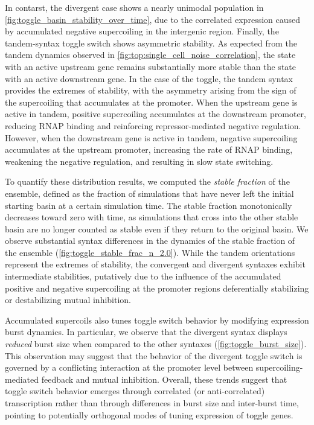 \documentclass[11pt]{article}
\begin{document}
In contarst, the divergent case shows a nearly unimodal population in \cref{fig:toggle_basin_stability_over_time}, due to the correlated expression caused by accumulated negative supercoiling in the intergenic region.
Finally, the tandem-syntax toggle switch shows asymmetric stability. As expected from the tandem dynamics observed in \cref{fig:top:single_cell_noise_correlation}, the state with an active upstream gene remains substantially more stable than the state with an active downstream gene. In the case of the toggle, the tandem syntax provides the extremes of stability, with the asymmetry arising from the sign of the supercoiling that accumulates at the promoter. When the upstream gene is active in tandem, positive supercoiling accumulates at the downstream promoter, reducing RNAP binding and reinforcing repressor-mediated negative regulation. However, when the downstream gene is active in tandem, negative supercoiling accumulates at the upstream promoter, increasing the rate of RNAP binding, weakening the negative regulation, and resulting in slow state switching.

To quantify these distribution results, we computed the \emph{stable fraction} of the ensemble, defined as the fraction of simulations that have never left the initial starting basin at a certain simulation time.
The stable fraction monotonically decreases toward zero with time, as simulations that cross into the other stable basin are no longer counted as stable even if they return to the original basin.
We observe substantial syntax differences in the dynamics of the stable fraction of the ensemble (\cref{fig:toggle_stable_frac_n_2.0}). While the tandem orientations represent the extremes of stability, the convergent and divergent syntaxes exhibit intermediate stabilities, putatively due to the influence of the accumulated positive and negative supercoiling at the promoter regions deferentially stabilizing or destabilizing mutual inhibition.

Accumulated supercoils also tunes toggle switch behavior by modifying expression burst dynamics. In particular, we observe that the divergent syntax displays \emph{reduced} burst size when compared to the other syntaxes (\cref{fig:toggle_burst_size}). This observation may suggest that the behavior of the divergent toggle switch is governed by a conflicting interaction at the promoter level between supercoiling-mediated feedback and mutual inhibition.
Overall, these trends suggest that toggle switch behavior emerges through correlated (or anti-correlated) transcription rather than through differences in burst size and inter-burst time, pointing to potentially orthogonal modes of tuning expression of toggle genes.
\end{document}
